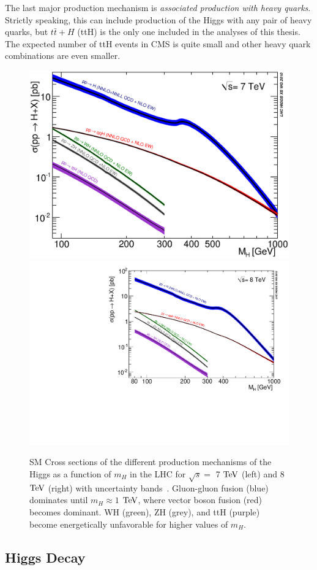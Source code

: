 The last major production mechanism is \textit{associated production with heavy quarks}. Strictly speaking, this can include production of the Higgs with any pair of heavy quarks, but $t\bar{t}+H$ (ttH) is the only one included in the analyses of this thesis. The expected number of ttH events in CMS is quite small and other heavy quark combinations are even smaller.

\begin{figure}[htbp]
\begin{center}
\includegraphics[width=.45\linewidth]{Phenomenology/figures/Higgs_XS_7TeV}
\includegraphics[width=.45\linewidth]{Phenomenology/figures/Higgs_XS_8TeV_lx.pdf}
\caption[Standard Model Production Mechanism of the Higgs at the LHC as a Function of the Higgs' Mass]{SM Cross sections of the different production mechanisms of the Higgs as a function of $m_H$ in the LHC for $\sqrt{s}=$ 7 $\rm{TeV}$ (left) and 8 $\rm{TeV}$ (right) with uncertainty bands~\cite{HXSWG_Properties}. Gluon-gluon fusion (blue) dominates until $m_H \approx 1$ $\rm{TeV}$, where vector boson fusion (red) becomes dominant. WH (green), ZH (grey), and ttH (purple) become energetically unfavorable for higher values of $m_H$.}
\label{fig:HXSWGProduction}
\end{center}
\end{figure}

\subsection{Higgs Decay}
\label{sec:HiggsDecay}

